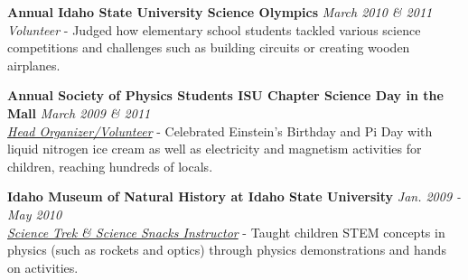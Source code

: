 \outreachspace
\textbf{Annual Idaho State University Science Olympics} \hfill \textit{March 2010 \& 2011}\\
\textit{Volunteer} - Judged how elementary school students tackled various science competitions and challenges such as building circuits or creating wooden airplanes.

\outreachspace
\textbf{Annual Society of Physics Students ISU Chapter Science Day in the Mall} \hfill \textit{March 2009 \& 2011}\\
\textit{\href{http://m.idahostatejournal.com/news/local/idaho-state-university-physics-club-receives-national-award/article_1823c468-8600-11e2-94b3-0019bb2963f4.html?mode=image&photo=0}{Head Organizer/Volunteer}} - Celebrated Einstein's Birthday and Pi Day with liquid nitrogen ice cream as well as electricity and magnetism activities for children, reaching hundreds of locals.

\outreachspace
\textbf{Idaho Museum of Natural History at Idaho State University} \hfill \textit{Jan. 2009 - May 2010}\\
\textit{\href{http://imnh.isu.edu/home/index.php/science-trek/}{Science Trek \& Science Snacks Instructor}} - Taught children STEM concepts in physics (such as rockets and optics) through physics demonstrations and hands on activities.






